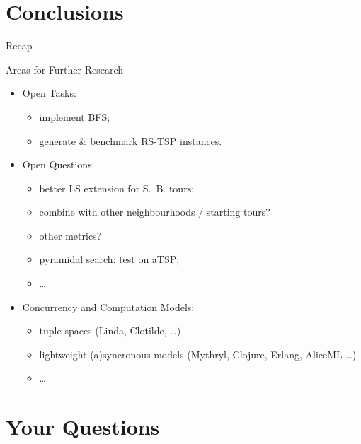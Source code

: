 \documentclass[
  size=10pt,
  style=klope,
  paper=screen,
  pauseslide,
  nopagebreaks,
  hlsections,
  fleqn
]{powerdot}
\begin{document}
\section[template=wideslide]{Conclusions}

\begin{slide}[toc=Recap]{Recap}
\tableofcontents[content=all,type=0]
\end{slide}

\begin{slide}{Areas for Further Research}
{\small

  \begin{itemize}
  \item
  Open Tasks:
    \begin{itemize}
    \item implement BFS;
    \item generate \& benchmark RS-TSP instances.
    \end{itemize}
  \item
  Open Questions:
    \begin{itemize}
    \item better LS extension for S.\ B. tours;
    \item combine with other neighbourhoods / starting tours?
    \item other metrics?
    \item pyramidal search: test on aTSP;
    \item \ldots
    \end{itemize}
  \item
  Concurrency and Computation Models:
    \begin{itemize}
    \item tuple spaces (Linda, Clotilde, \ldots)
    \item lightweight (a)syncronous models (Mythryl, Clojure, Erlang, AliceML \ldots)
    \item \ldots
    \end{itemize}
  \end{itemize}

}
\end{slide}


\section[template=wideslide]{Your Questions}
\end{document}
